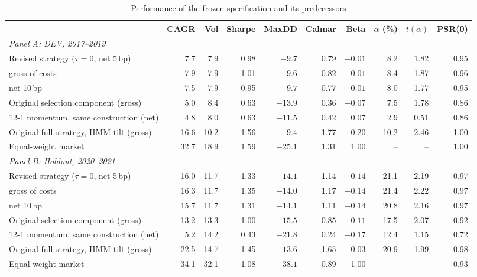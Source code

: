 \begin{table}[p]
\centering\small
\caption{Performance of the frozen specification and its predecessors}\label{tab:perf}
\begin{adjustbox}{max width=\textwidth}\begin{tabular}{lrrrrrrrrr}
\toprule
 & CAGR & Vol & Sharpe & MaxDD & Calmar & Beta & $\alpha$ (\%) & $t(\alpha)$ & PSR(0)\\
\midrule
\multicolumn{10}{l}{\emph{Panel A: DEV, 2017--2019}}\\
Revised strategy ($\tau=0$, net 5\,bp) & 7.7 & 7.9 & 0.98 & $-9.7$ & 0.79 & $-0.01$ & 8.2 & 1.82 & 0.95\\
\quad gross of costs & 7.9 & 7.9 & 1.01 & $-9.6$ & 0.82 & $-0.01$ & 8.4 & 1.87 & 0.96\\
\quad net 10\,bp & 7.5 & 7.9 & 0.95 & $-9.7$ & 0.77 & $-0.01$ & 8.0 & 1.77 & 0.95\\
Original selection component (gross) & 5.0 & 8.4 & 0.63 & $-13.9$ & 0.36 & $-0.07$ & 7.5 & 1.78 & 0.86\\
12-1 momentum, same construction (net) & 4.8 & 8.0 & 0.63 & $-11.5$ & 0.42 & 0.07 & 2.9 & 0.51 & 0.86\\
Original full strategy, HMM tilt (gross) & 16.6 & 10.2 & 1.56 & $-9.4$ & 1.77 & 0.20 & 10.2 & 2.46 & 1.00\\
Equal-weight market & 32.7 & 18.9 & 1.59 & $-25.1$ & 1.31 & 1.00 & -- & -- & 1.00\\
\midrule
\multicolumn{10}{l}{\emph{Panel B: Holdout, 2020--2021}}\\
Revised strategy ($\tau=0$, net 5\,bp) & 16.0 & 11.7 & 1.33 & $-14.1$ & 1.14 & $-0.14$ & 21.1 & 2.19 & 0.97\\
\quad gross of costs & 16.3 & 11.7 & 1.35 & $-14.0$ & 1.17 & $-0.14$ & 21.4 & 2.22 & 0.97\\
\quad net 10\,bp & 15.7 & 11.7 & 1.31 & $-14.1$ & 1.11 & $-0.14$ & 20.8 & 2.16 & 0.97\\
Original selection component (gross) & 13.2 & 13.3 & 1.00 & $-15.5$ & 0.85 & $-0.11$ & 17.5 & 2.07 & 0.92\\
12-1 momentum, same construction (net) & 5.2 & 14.2 & 0.43 & $-21.8$ & 0.24 & $-0.17$ & 12.4 & 1.15 & 0.72\\
Original full strategy, HMM tilt (gross) & 22.5 & 14.7 & 1.45 & $-13.6$ & 1.65 & 0.03 & 20.9 & 1.99 & 0.98\\
Equal-weight market & 34.1 & 32.1 & 1.08 & $-38.1$ & 0.89 & 1.00 & -- & -- & 0.93\\
\midrule

\end{tabular}
\end{adjustbox}
\end{table}
